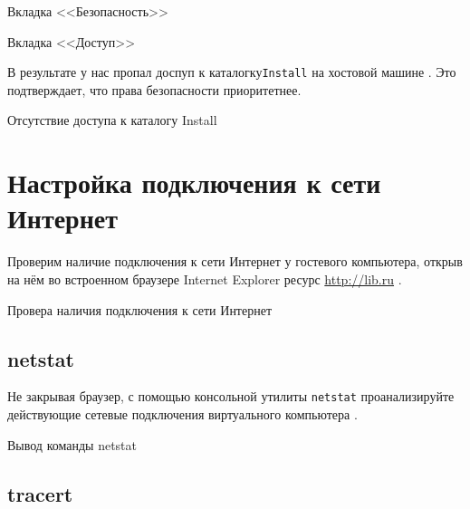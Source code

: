 \begin{image}
	\caption{Вкладка <<Безопасность>>}
	\label{fig:dir:prop:satery}
\end{image}

\begin{image}
	\caption{Вкладка <<Доступ>>}
	\label{fig:dir:prop}
\end{image}

В результате у нас пропал доспуп к каталогку\texttt{Install}
на хостовой машине .
Это подтверждает, что права безопасности приоритетнее.

\begin{image}
	\caption{Отсутствие доступа к каталогу Install}
	\label{fig:dir:install:error}
\end{image}

\section{Настройка подключения к сети Интернет}

Проверим наличие подключения к сети Интернет у гостевого компьютера,
открыв на нём во встроенном браузере Internet Explorer
ресурс \url{http://lib.ru} .

\begin{image}
	\caption{Провера наличия подключения к сети Интернет}
	\label{fig:lib}
\end{image}

\subsection{netstat}

Не закрывая браузер, с помощью консольной утилиты
\texttt{netstat} проанализируйте действующие сетевые подключения виртуального
компьютера .

\begin{image}
	\caption{Вывод команды netstat}
	\label{fig:netstat}
\end{image}

\subsection{tracert}

